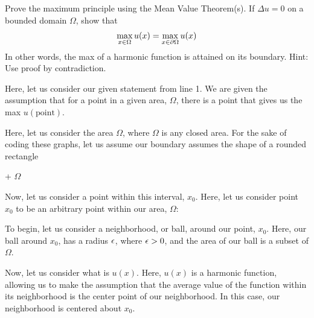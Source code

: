 \item Prove the maximum principle using the Mean Value Theorem(s). If $\Delta u = 0$ on a bounded domain $\Omega$, show that
%
\begin{align}
  \max_{x \in \Omega} u(x) = \max_{x \in \partial \Omega} u(x)
\end{align}
In other words, the max of a harmonic function is attained on its boundary. Hint: Use proof by contradiction.
\bigbreak

Here, let us consider our given statement from line 1. We are given the assumption that for a point in a given area, $\Omega$, there is a point that gives us the max $u(\text{point})$.

Here, let us consider the area $\Omega$, where $\Omega$ is any closed area.
For the sake of coding these graphs, let us assume our boundary assumes the shape of a rounded rectangle %

\begin{center}
  + $\Omega$ %
\end{center}

Now, let us consider a point within this interval, $x_0$. Here, let us consider point $x_0$ to be an arbitrary point within our area, $\Omega$:

\begin{center}
\end{center}

To begin, let us consider a neighborhood, or ball, around our point, $x_0$. Here, our ball around $x_0$, has a radius $\epsilon$, where $\epsilon > 0$, and the area of our ball is a subset of $\Omega$.

\begin{center}
\end{center}

Now, let us consider what is $u(x)$. Here, $u(x)$ is a harmonic function,
allowing us to make the assumption that the average value of the function
within its neighborhood is the center point of our neighborhood. In this case,
our neighborhood is centered about $x_0$.

\begin{center}
\end{center}

